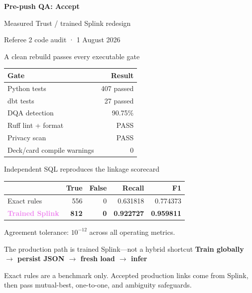 \documentclass[aspectratio=169,11pt]{beamer}
\begin{document}
\begin{frame}[plain]
  \vfill
  {\fontsize{34}{39}\selectfont\bfseries\color{Ink}Pre-push QA: Accept}\par
  \vspace{0.25cm}
  {\Large\color{Teal}Measured Trust / trained Splink redesign}\par
  \vfill
  {\large\color{Slate}Referee 2 code audit · 1 August 2026}
\end{frame}

\begin{frame}{A clean rebuild passes every executable gate}
  \centering
  \begin{tabular}{@{}lr@{}}
    \toprule
    \textbf{Gate} & \textbf{Result} \\
    \midrule
    Python tests & 407 passed \\
    dbt tests & 27 passed \\
    DQA detection & 90.75\% \\
    Ruff lint + format & PASS \\
    Privacy scan & PASS \\
    Deck/card compile warnings & 0 \\
    \bottomrule
  \end{tabular}
\end{frame}

\begin{frame}{Independent SQL reproduces the linkage scorecard}
  \centering
  \begin{tabular}{@{}lrrrr@{}}
    \toprule
    & \textbf{True} & \textbf{False} & \textbf{Recall} & \textbf{F1} \\
    \midrule
    Exact rules & 556 & 0 & 0.631818 & 0.774373 \\
    \textcolor{Violet}{\textbf{Trained Splink}} & \textbf{812} & \textbf{0} & \textbf{0.922727} & \textbf{0.959811} \\
    \bottomrule
  \end{tabular}

  \vspace{0.65cm}
  {\large Agreement tolerance: $10^{-12}$ across all operating metrics.}
\end{frame}

\begin{frame}{The production path is trained Splink—not a hybrid shortcut}
  \vspace{0.35cm}
  {\Large\bfseries\color{Teal}Train globally $\rightarrow$ persist JSON $\rightarrow$ fresh load $\rightarrow$ infer}\par
  \vspace{0.65cm}
  {\large Exact rules are a benchmark only. Accepted production links come from
  Splink, then pass mutual-best, one-to-one, and ambiguity safeguards.}
\end{frame}
\end{document}
